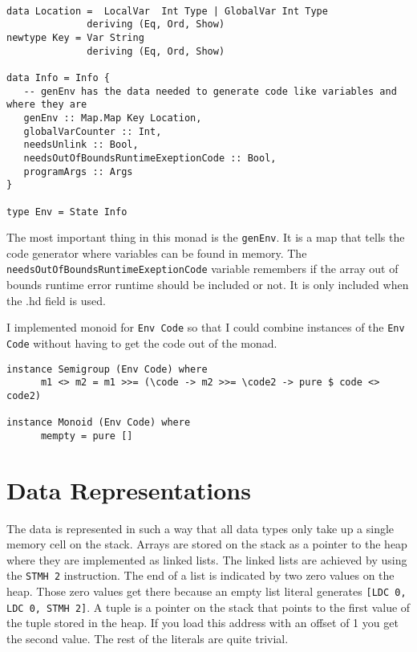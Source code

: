 \documentclass{report}
\begin{document}
\begin{verbatim}

data Location =  LocalVar  Int Type | GlobalVar Int Type
              deriving (Eq, Ord, Show)
newtype Key = Var String
              deriving (Eq, Ord, Show)

data Info = Info {
   -- genEnv has the data needed to generate code like variables and where they are 
   genEnv :: Map.Map Key Location,
   globalVarCounter :: Int,
   needsUnlink :: Bool,
   needsOutOfBoundsRuntimeExeptionCode :: Bool,
   programArgs :: Args
}

type Env = State Info
\end{verbatim}

The most important thing in this monad is the \texttt{genEnv}. It is a map that tells the code generator where variables can be found in memory. The \texttt{needsOutOfBoundsRuntimeExeptionCode} variable remembers if the array out of bounds runtime error runtime should be included or not. It is only included when the .hd field is used. 

\noindent I implemented monoid for \texttt{Env Code} so that I could combine instances of the \texttt{Env Code} without having to get the code out of the monad.

\begin{verbatim}
instance Semigroup (Env Code) where
      m1 <> m2 = m1 >>= (\code -> m2 >>= \code2 -> pure $ code <> code2)

instance Monoid (Env Code) where
      mempty = pure []
\end{verbatim}

\section{Data Representations}

The data is represented in such a way that all data types only take up a single memory cell on the stack. Arrays are stored on the stack as a pointer to the heap where they are implemented as linked lists. The linked lists are achieved by using the \texttt{STMH 2} instruction. The end of a list is indicated by two zero values on the heap. Those zero values get there because an empty list literal generates \texttt{[LDC 0, LDC 0, STMH 2]}. A tuple is a pointer on the stack that points to the first value of the tuple stored in the heap. If you load this address with an offset of 1 you get the second value. The rest of the literals are quite trivial.
\end{document}
